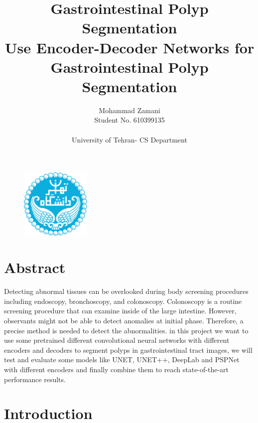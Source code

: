 \documentclass[12pt]{article}
\title{\textbf{\Luge Gastrointestinal Polyp Segmentation}\\[1ex] Use Encoder-Decoder Networks for Gastrointestinal Polyp Segmentation}
\author{\Large{ Mohammad Zamani}  \\ \Large{Student No. 610399135} \\ \\ \Large{University of Tehran- CS Department}}
\date{}
\begin{document}

	
	\begin{titlingpage}
	
	\begin{figure}
		\centering
		\includegraphics[width=0.3\textwidth]{Figs/University_of_Tehran_logo.png}		
	\end{figure}		\maketitle
	
	\end{titlingpage}
		
	



	\setlength{\parindent}{20pt}
	\tableofcontents
	
	\vspace{1\baselineskip}

	\pagebreak
	\section{Abstract}

	Detecting abnormal tissues can be overlooked during body screening procedures including endoscopy, bronchoscopy, and colonoscopy. Colonoscopy is a routine screening procedure that can examine inside of the large intestine. However, observants might not be able to detect anomalies at initial phase. Therefore, a precise method is needed to detect the abnormalities. in this project we want to use  some pretrained different convolutional neural networks with different encoders and decoders to segment polyps in gastrointestinal tract images, we will test and evaluate some models like UNET, UNET++, DeepLab and PSPNet with different encoders and finally combine them to reach state-of-the-art performance results.

	\section{Introduction}
	
\end{document}
